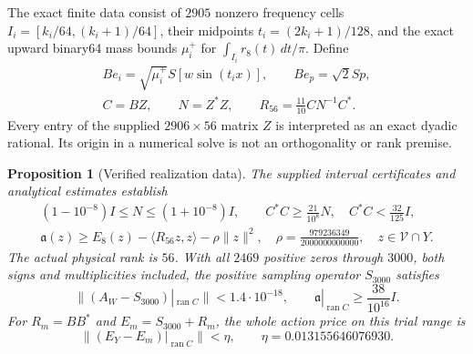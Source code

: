 \documentclass[12pt]{article}
\newtheorem{proposition}[theorem]{Proposition}
\theoremstyle{remark}\newtheorem{remark}[theorem]{Remark}
\newcommand{\Ran}{\operatorname{ran}}
\newcommand{\dd}{\,d}
\begin{document}
The exact finite data consist of $2905$ nonzero frequency cells
$I_i=[k_i/64,(k_i+1)/64]$, their midpoints $t_i=(2k_i+1)/128$,
and the exact upward binary64 mass bounds $\mu_i^+$ for
$\int_{I_i}r_8(t)\dd t/\pi$. Define
\begin{gather*}
 Be_i=\sqrt{\mu_i^+}S[w\sin(t_ix)],\qquad Be_p=\sqrt2Sp,\\
 C=BZ,\qquad N=Z^*Z,\qquad R_{56}=\frac{11}{10}CN^{-1}C^*.
\end{gather*}
Every entry of the supplied $2906\times56$ matrix $Z$ is interpreted
as an exact dyadic rational. Its origin in a numerical solve is not
an orthogonality or rank premise.

\begin{proposition}[Verified realization data]\label{inputs}
The supplied interval certificates and analytical estimates establish
\begin{gather*}
 (1-10^{-8})I\le N\le(1+10^{-8})I,\qquad
 C^*C\ge\frac{21}{10^8}N,\quad C^*C<\frac{32}{125}I,\\
 \mathfrak a(z)\ge E_8(z)-\langle R_{56}z,z\rangle-\rho\|z\|^2,
 \quad \rho=\frac{979236349}{2000000000000},\quad z\in\mathcal V\cap Y.
\end{gather*}
The actual physical rank is $56$. With all $2469$ positive zeros
through $3000$, both signs and multiplicities included, the positive
sampling operator $S_{3000}$ satisfies
\[
 \|(A_W-S_{3000})|_{\Ran C}\|<1.4\cdot10^{-18},\qquad
 \mathfrak a|_{\Ran C}\ge\frac{38}{10^{16}}I.
\]
For $R_m=BB^*$ and $E_m=S_{3000}+R_m$, the whole action price on
this trial range is
\[
 \|(E_Y-E_m)|_{\Ran C}\|<\eta,
 \qquad \eta=0.013155646076930.
\]
\end{proposition}
\end{document}
